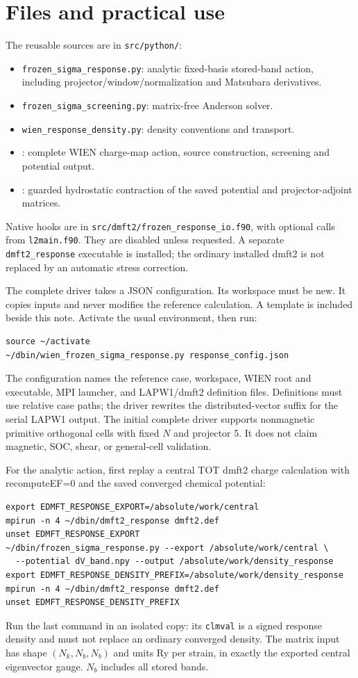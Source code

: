 \documentclass[11pt]{article}
\begin{document}
\section{Files and practical use}
The reusable sources are in \texttt{src/python/}:
\begin{itemize}
\item \texttt{frozen\_sigma\_response.py}: analytic fixed-basis stored-band
action, including projector/window/normalization and Matsubara derivatives.
\item \texttt{frozen\_sigma\_screening.py}: matrix-free Anderson solver.
\item \texttt{wien\_response\_density.py}: density conventions and transport.
\item {}: complete WIEN charge-map
action, source construction, screening and potential output.
\item {}: guarded hydrostatic contraction of the saved potential and projector-adjoint matrices.
\end{itemize}
Native hooks are in \texttt{src/dmft2/frozen\_response\_io.f90}, with optional
calls from \texttt{l2main.f90}. They are disabled unless requested. A
separate \texttt{dmft2\_response} executable is installed; the ordinary
installed dmft2 is not replaced by an automatic stress correction.

The complete driver takes a JSON configuration. Its workspace must be new.
It copies inputs and never modifies the reference calculation. A template is
included beside this note. Activate the usual environment, then run:
\begin{lstlisting}
source ~/activate
~/dbin/wien_frozen_sigma_response.py response_config.json
\end{lstlisting}
The configuration names the reference case, workspace, WIEN root and executable,
MPI launcher, and LAPW1/dmft2 definition files. Definitions must use relative
case paths; the driver rewrites the distributed-vector suffix for the serial
LAPW1 output. The initial complete driver supports nonmagnetic primitive
orthogonal cells with fixed $N$ and projector 5. It does not claim magnetic,
SOC, shear, or general-cell validation.

For the analytic action, first replay a central TOT dmft2 charge calculation
with recomputeEF=0 and the saved converged chemical potential:
\begin{lstlisting}
export EDMFT_RESPONSE_EXPORT=/absolute/work/central
mpirun -n 4 ~/dbin/dmft2_response dmft2.def
unset EDMFT_RESPONSE_EXPORT
~/dbin/frozen_sigma_response.py --export /absolute/work/central \
  --potential dV_band.npy --output /absolute/work/density_response
export EDMFT_RESPONSE_DENSITY_PREFIX=/absolute/work/density_response
mpirun -n 4 ~/dbin/dmft2_response dmft2.def
unset EDMFT_RESPONSE_DENSITY_PREFIX
\end{lstlisting}
Run the last command in an isolated copy: its \texttt{clmval} is a signed
response density and must not replace an ordinary converged density. The
matrix input has shape $(N_k,N_b,N_b)$ and units Ry per strain, in exactly
the exported central eigenvector gauge. $N_b$ includes all stored bands.
\end{document}
